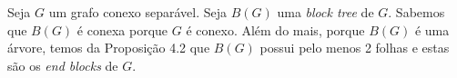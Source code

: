 
Seja $G$ um grafo conexo separável. Seja $B(G)$ uma \emph{block tree} de $G$.
Sabemos que $B(G)$ é conexa porque $G$ é conexo. Além do mais, porque $B(G)$ é
uma árvore, temos da Proposição 4.2 que $B(G)$ possui pelo menos 2 folhas e
estas são os \emph{end blocks} de $G$.
\fimprova

